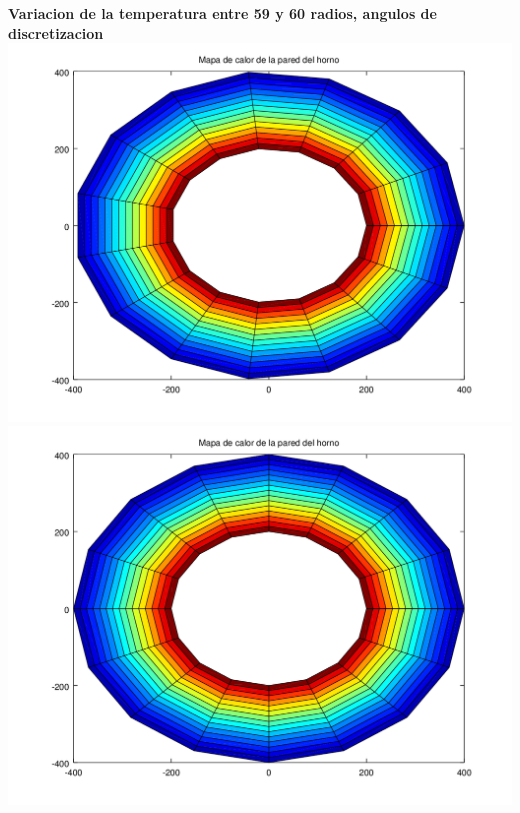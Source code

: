 \begin{enumerate}
	  	\textbf{Variacion de la temperatura entre 59 y 60 radios, angulos de discretizacion}\\
	  	\includegraphics[scale=0.35]{experimentos1a_1b/evolucion_posicion_isoterma_temperatura/variacion_radios_angulos_se_reduce_diferencia_radial/test11_testord_001_inst_001_heatmap.png}
		\includegraphics[scale=0.35]{experimentos1a_1b/evolucion_posicion_isoterma_temperatura/variacion_radios_angulos_se_reduce_diferencia_radial/test11_testord_002_inst_001_heatmap.png}


\end{enumerate}
